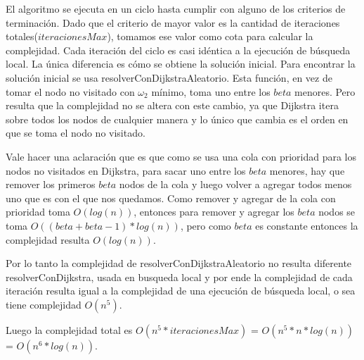El algoritmo se ejecuta en un ciclo hasta cumplir con alguno de los criterios de terminación. Dado que el criterio de mayor valor es la cantidad de iteraciones totales($iteracionesMax$), tomamos ese valor como cota para calcular la complejidad.
Cada iteración del ciclo es casi idéntica a la ejecución de búsqueda local. La única diferencia es cómo se obtiene la solución inicial. Para encontrar la solución inicial se usa resolverConDijkstraAleatorio. Esta función, en vez de tomar el nodo no visitado con $\omega_2$ mínimo, toma uno entre los $beta$ menores. Pero resulta que la complejidad no se altera con este cambio, ya que Dijkstra itera sobre todos los nodos de cualquier manera y lo único que cambia es el orden en que se toma el nodo no visitado. 

Vale hacer una aclaración que es que como se usa una cola con prioridad para los nodos no visitados en Dijkstra, para sacar uno entre los $beta$ menores, hay que remover los primeros $beta$ nodos de la cola y luego volver a agregar todos menos uno que es con el que nos quedamos. Como remover y agregar de la cola con prioridad toma $O(log(n))$, entonces para remover y agregar los $beta$ nodos se toma $O((beta + beta-1) * log(n))$, pero como $beta$ es constante entonces la complejidad resulta $O(log(n))$. 

Por lo tanto la complejidad de resolverConDijkstraAleatorio no resulta diferente resolverConDijkstra, usada en busqueda local y por ende la complejidad de cada iteración resulta igual a la complejidad de una ejecución de búsqueda local, o sea tiene complejidad $O(n^5)$.

Luego la complejidad total es $O(n^5 * iteracionesMax)$ = $O(n^5 * n*log(n))$ = $O(n^6 * log(n))$.
